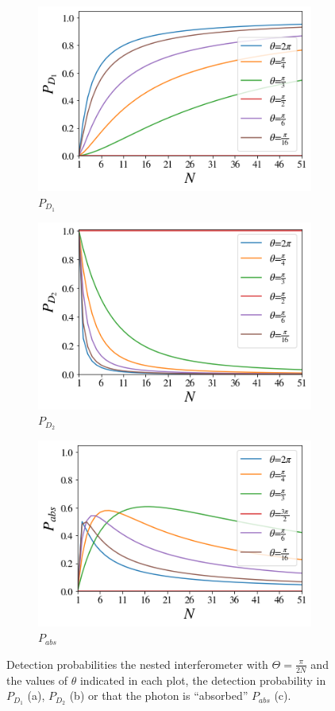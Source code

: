 \documentclass[12pt]{book}
\begin{document}
 \begin{figure}[t]
\centering
\begin{subfigure}[b]{0.45\linewidth}
\includegraphics[width=\linewidth,height=5 cm]{images/BS_Azuna.png}
\caption{$P_{D_{1}}$}

\end{subfigure}
\begin{subfigure}[b]{0.45\linewidth}
\includegraphics[width=\linewidth,height=5 cm]{images/BS_AzunaD2.png}
\caption{$P_{D_{2}}$}
\label{fig:westminster_aerea}
\end{subfigure}
\begin{subfigure}[b]{0.45\linewidth}
\includegraphics[width=\linewidth,height=5 cm]{images/absorbido_azuna.png}
\caption{$P_{abs}$}
\label{fig:BS1}
\end{subfigure}
\caption{Detection probabilities the nested interferometer with $\Theta=\frac{\pi}{2N}$ and the values of $\theta$ indicated in each plot, the detection probability in $P_{D_{1}}$ (a), $P_{D_{2}}$ (b) or that the photon is ``absorbed'' $P_{abs}$ (c). }
\label{Azuma1}
\end{figure}
\end{document}
